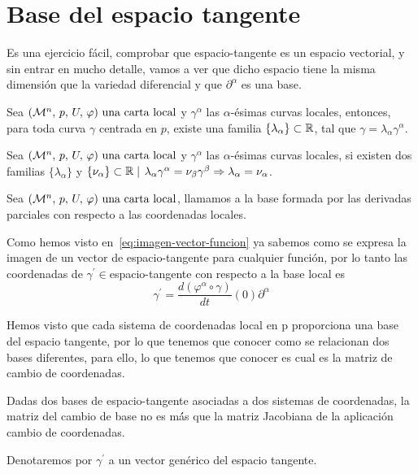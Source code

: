 \section{Base del espacio tangente}\label{sec:base-espacio-tangente}

Es una ejercicio fácil, comprobar que \gls{espacio-tangente} es un espacio vectorial, y sin entrar en mucho
detalle, vamos a ver que dicho espacio tiene la misma dimensión que la variedad diferencial y que ${\partial^\alpha}$ es una base.

\begin{proposition}
  Sea $(\mathcal{M}^n,\thinspace p,\thinspace U,\thinspace \varphi)\textmd{ una carta local}$ y ${\gamma^\alpha}$ las $\alpha$-ésimas curvas locales, entonces, para toda curva $\gamma$
  centrada en $p$, existe una familia $\{\lambda_\alpha\}\subset\mathbb{R}$, tal que $\gamma=\lambda_\alpha\gamma^\alpha$.
\end{proposition}

\begin{proposition}
  Sea $(\mathcal{M}^n,\thinspace p,\thinspace U,\thinspace \varphi)\textmd{ una carta local}$ y ${\gamma^\alpha}$ las $\alpha$-ésimas curvas locales, si existen dos familias
  $\{\lambda_\alpha\}$ y $\{\nu_\alpha\}\subset\mathbb{R}\mid$
  $\lambda_\alpha\gamma^\alpha=\nu_\beta\gamma^\beta\Rightarrow\lambda_\alpha=\nu_\alpha$.
\end{proposition}

\begin{definition}
  Sea $(\mathcal{M}^n,\thinspace p,\thinspace U,\thinspace \varphi)\textmd{ una carta local}$, llamamos  a la base
  formada por las derivadas parciales con respecto a las coordenadas locales.
\end{definition}

Como hemos visto en~\ref{eq:imagen-vector-funcion} ya sabemos como se expresa la imagen de un vector de
\gls{espacio-tangente} para cualquier función, por lo tanto las coordenadas de $\gamma^{'}\in$\gls{espacio-tangente}
con respecto a la base local es
\begin{equation}\label{eq:vector-tangente-coordenadas-locales}
\gamma^{'}=\frac{d(\varphi^\alpha\circ\gamma)}{dt}(0)\partial^\alpha
\end{equation}

Hemos visto que cada sistema de coordenadas local en p proporciona una base del espacio tangente, por lo que tenemos
que conocer como se relacionan dos bases diferentes, para ello, lo que tenemos que conocer es cual es la matriz de
cambio de coordenadas.

\begin{proposition}
  Dadas dos bases de \gls{espacio-tangente} asociadas a dos sistemas de coordenadas, la matriz del cambio de base no es
  má́s que la matriz Jacobiana de la aplicación cambio de coordenadas.
\end{proposition}

\begin{notation}
  Denotaremos por $\gamma^{'}$ a un vector genérico del espacio tangente.
\end{notation}